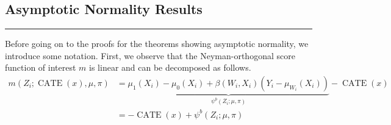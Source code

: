 \subsection{Asymptotic Normality Results}
\hrule

Before going on to the proofs for the theorems showing asymptotic normality, we introduce some notation.
First, we observe that the Neyman-orthogonal score function of interest $m$ is linear and can be decomposed as follows.
\begin{equation}
    \begin{aligned}
        m\left(Z_{i}; \operatorname{CATE}(x), \mu, \pi\right)
		  & = \underbrace{\mu_1\left(X_{i}\right) - \mu_0\left(X_{i}\right) + \beta\left(W_{i}, X_{i}\right)\left(Y_{i} - \mu_{W_{i}}\left(X_{i}\right)\right)}_{\psi^{b}\left(Z_{i}; \mu, \pi\right)} 
          - \operatorname{CATE}\left(x\right)\\
          & = - \operatorname{CATE}\left(x\right) + \psi^{b}\left(Z_{i}; \mu, \pi\right)
    \end{aligned}
\end{equation}  
